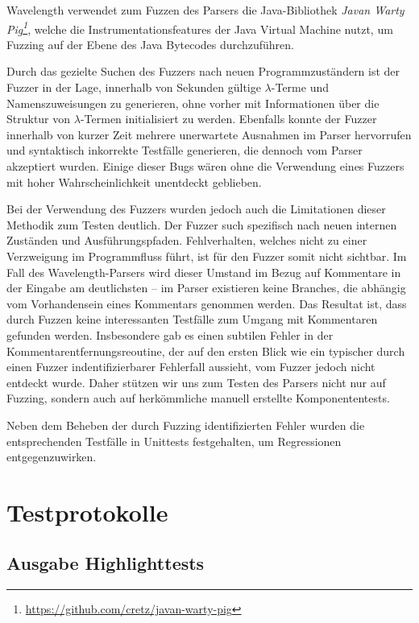\documentclass[parskip=full,11pt,openany]{scrreprt}
\begin{document}
Wavelength verwendet zum Fuzzen des Parsers die Java-Bibliothek
\textit{Javan Warty Pig\footnote{\url{https://github.com/cretz/javan-warty-pig}}},
welche die Instrumentationsfeatures der Java Virtual Machine nutzt, um Fuzzing
auf der Ebene des Java Bytecodes durchzuführen.

Durch das gezielte Suchen des Fuzzers nach neuen Programmzuständern ist der
Fuzzer in der Lage, innerhalb von Sekunden gültige $\lambda$-Terme und
Namenszuweisungen zu generieren, ohne vorher mit Informationen über die Struktur
von $\lambda$-Termen initialisiert zu werden. Ebenfalls konnte der Fuzzer innerhalb
von kurzer Zeit mehrere unerwartete Ausnahmen im Parser hervorrufen und syntaktisch
inkorrekte Testfälle generieren, die dennoch vom Parser akzeptiert wurden. Einige
dieser Bugs wären ohne die Verwendung eines Fuzzers mit hoher Wahrscheinlichkeit
unentdeckt geblieben.

Bei der Verwendung des Fuzzers wurden jedoch auch die Limitationen dieser Methodik
zum Testen deutlich. Der Fuzzer such spezifisch nach neuen internen Zuständen und
Ausführungspfaden. Fehlverhalten, welches nicht zu einer Verzweigung im
Programmfluss führt, ist für den Fuzzer somit nicht sichtbar. Im Fall des
Wavelength-Parsers wird dieser Umstand im Bezug auf Kommentare in der Eingabe
am deutlichsten -- im Parser existieren keine Branches, die abhängig vom
Vorhandensein eines Kommentars genommen werden. Das Resultat ist, dass durch
Fuzzen keine interessanten Testfälle zum Umgang mit Kommentaren gefunden werden.
Insbesondere gab es einen subtilen Fehler in der Kommentarentfernungsreoutine,
der auf den ersten Blick wie ein typischer durch einen Fuzzer indentifizierbarer
Fehlerfall aussieht, vom Fuzzer jedoch nicht entdeckt wurde. Daher stützen wir
uns zum Testen des Parsers nicht nur auf Fuzzing, sondern auch auf herkömmliche
manuell erstellte Komponententests.

Neben dem Beheben der durch Fuzzing identifizierten Fehler wurden die entsprechenden
Testfälle in Unittests festgehalten, um Regressionen entgegenzuwirken.

\chapter{Testprotokolle}

\section{Ausgabe Highlighttests}
\end{document}
